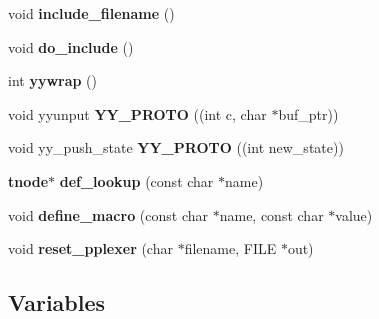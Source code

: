 \begin{CompactItemize}
\item 
void {\bf include\_\-filename} ()
\item 
void {\bf do\_\-include} ()
\item 
int {\bf yywrap} ()
\item 
void yyunput {\bf YY\_\-PROTO} ((int c, char $\ast$buf\_\-ptr))
\item 
void yy\_\-push\_\-state {\bf YY\_\-PROTO} ((int new\_\-state))
\item 
{\bf tnode}$\ast$ {\bf def\_\-lookup} (const char $\ast$name)
\item 
void {\bf define\_\-macro} (const char $\ast$name, const char $\ast$value)
\item 
void {\bf reset\_\-pplexer} (char $\ast$filename, FILE $\ast$out)
\end{CompactItemize}
\subsection*{Variables}
